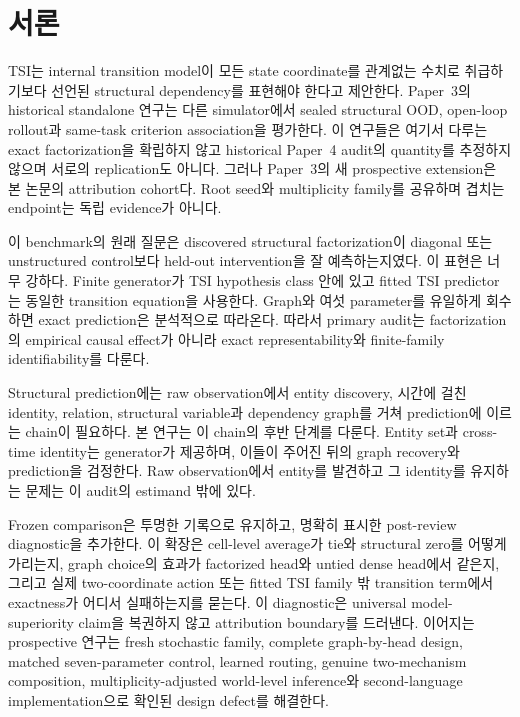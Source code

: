 \section{서론}

TSI는 internal transition model이 모든 state coordinate를 관계없는 수치로
취급하기보다 선언된 structural dependency를 표현해야 한다고 제안한다. Paper~3의
historical standalone 연구는 다른 simulator에서 sealed structural OOD, open-loop
rollout과 same-task criterion association을 평가한다. 이 연구들은 여기서 다루는
exact factorization을 확립하지 않고 historical Paper~4 audit의 quantity를 추정하지
않으며 서로의 replication도 아니다. 그러나 Paper~3의 새 prospective extension은
본 논문의 attribution cohort다. Root seed와 multiplicity family를 공유하며 겹치는
endpoint는 독립 evidence가 아니다.

이 benchmark의 원래 질문은 discovered structural factorization이 diagonal 또는
unstructured control보다 held-out intervention을 잘 예측하는지였다. 이 표현은 너무
강하다. Finite generator가 TSI hypothesis class 안에 있고 fitted TSI predictor는
동일한 transition equation을 사용한다. Graph와 여섯 parameter를 유일하게 회수하면
exact prediction은 분석적으로 따라온다. 따라서 primary audit는 factorization의
empirical causal effect가 아니라 exact representability와 finite-family
identifiability를 다룬다.

Structural prediction에는 raw observation에서 entity discovery, 시간에 걸친
identity, relation, structural variable과 dependency graph를 거쳐 prediction에
이르는 chain이 필요하다. 본 연구는 이 chain의 후반 단계를 다룬다. Entity set과
cross-time identity는 generator가 제공하며, 이들이 주어진 뒤의 graph recovery와
prediction을 검정한다. Raw observation에서 entity를 발견하고 그 identity를
유지하는 문제는 이 audit의 estimand 밖에 있다.

Frozen comparison은 투명한 기록으로 유지하고, 명확히 표시한 post-review
diagnostic을 추가한다. 이 확장은 cell-level average가 tie와 structural zero를 어떻게
가리는지, graph choice의 효과가 factorized head와 untied dense head에서 같은지,
그리고 실제 two-coordinate action 또는 fitted TSI family 밖 transition term에서
exactness가 어디서 실패하는지를 묻는다. 이 diagnostic은 universal model-superiority
claim을 복권하지 않고 attribution boundary를 드러낸다. 이어지는 prospective
연구는 fresh stochastic family, complete graph-by-head design, matched
seven-parameter control, learned routing, genuine two-mechanism composition,
multiplicity-adjusted world-level inference와 second-language implementation으로
확인된 design defect를 해결한다.
